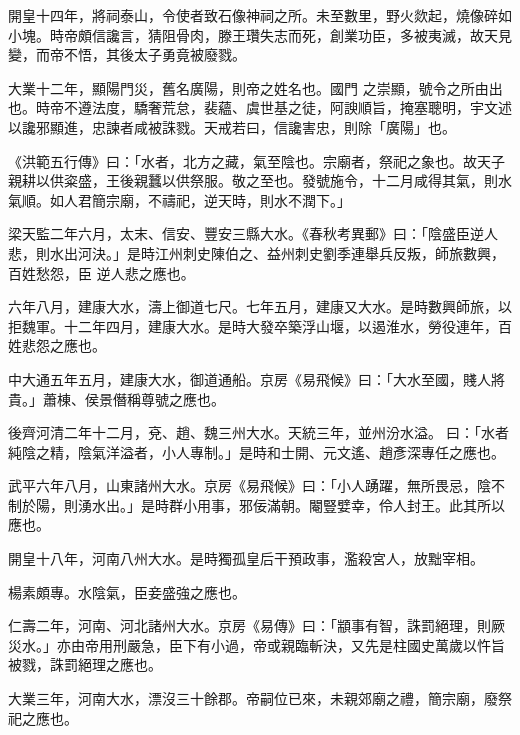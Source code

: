 \begin{pinyinscope}
 開皇十四年，將祠泰山，令使者致石像神祠之所。未至數里，野火欻起，燒像碎如小塊。時帝頗信讒言，猜阻骨肉，滕王瓚失志而死，創業功臣，多被夷滅，故天見變，而帝不悟，其後太子勇竟被廢戮。



 大業十二年，顯陽門災，舊名廣陽，則帝之姓名也。國門
 之崇顯，號令之所由出也。時帝不遵法度，驕奢荒怠，裴蘊、虞世基之徒，阿諛順旨，掩塞聰明，宇文述以讒邪顯進，忠諫者咸被誅戮。天戒若曰，信讒害忠，則除「廣陽」也。



 《洪範五行傳》曰：「水者，北方之藏，氣至陰也。宗廟者，祭祀之象也。故天子親耕以供粢盛，王後親蠶以供祭服。敬之至也。發號施令，十二月咸得其氣，則水氣順。如人君簡宗廟，不禱祀，逆天時，則水不潤下。」



 梁天監二年六月，太末、信安、豐安三縣大水。《春秋考異郵》曰：「陰盛臣逆人悲，則水出河決。」是時江州刺史陳伯之、益州刺史劉季連舉兵反叛，師旅數興，百姓愁怨，臣
 逆人悲之應也。



 六年八月，建康大水，濤上御道七尺。七年五月，建康又大水。是時數興師旅，以拒魏軍。十二年四月，建康大水。是時大發卒築浮山堰，以遏淮水，勞役連年，百姓悲怨之應也。



 中大通五年五月，建康大水，御道通船。京房《易飛候》曰：「大水至國，賤人將貴。」蕭棟、侯景僭稱尊號之應也。



 後齊河清二年十二月，兗、趙、魏三州大水。天統三年，並州汾水溢。曰：「水者純陰之精，陰氣洋溢者，小人專制。」是時和士開、元文遙、趙彥深專任之應也。



 武平六年八月，山東諸州大水。京房《易飛候》曰：「小人踴躍，無所畏忌，陰不制於陽，則湧水出。」是時群小用事，邪佞滿朝。閹豎嬖幸，伶人封王。此其所以應也。



 開皇十八年，河南八州大水。是時獨孤皇后干預政事，濫殺宮人，放黜宰相。



 楊素頗專。水陰氣，臣妾盛強之應也。



 仁壽二年，河南、河北諸州大水。京房《易傳》曰：「顓事有智，誅罰絕理，則厥災水。」亦由帝用刑嚴急，臣下有小過，帝或親臨斬決，又先是柱國史萬歲以忤旨被戮，誅罰絕理之應也。



 大業三年，河南大水，漂沒三十餘郡。帝嗣位已來，未親郊廟之禮，簡宗廟，廢祭祀之應也。




\end{pinyinscope}
